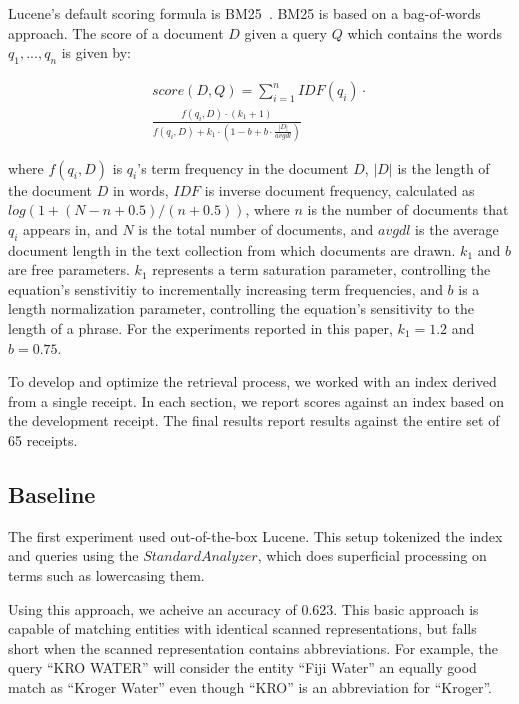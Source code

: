 \documentclass[11pt,a4paper]{article}
\begin{document}
Lucene's default scoring formula is
BM25~\cite{robertson:2009}.  BM25 is based on a
bag-of-words approach. The score of a document $D$ given a query $Q$
which contains the words $q_1, ..., q_n$ is given by: 

\begin{equation}
\begin{split}
  \label{eq:bm25}
score(D,Q) = \sum_{i=1}^{n} IDF(q_i) \cdot \\
  \frac{f(q_i, D) \cdot (k_1 + 1)}{f(q_i, D) + k_1 \cdot (1 - b + b
    \cdot \frac{|D|}{avgdl})}
\end{split}
\end{equation}

where $f(q_i, D)$ is $q_i$'s term frequency in the document $D$, $|D|$
is the length of the document $D$ in words,
$IDF$ is inverse document frequency, calculated as $log(1 + (N - n + 0.5) / (n + 0.5))$, 
where $n$ is the number of documents that $q_i$ appears in, and $N$
is the total number of documents,
and $avgdl$ is the average
document length in the text collection from which documents are
drawn. $k_1$ and $b$ are free parameters.  $k_1$ represents a term
saturation parameter, controlling the equation's senstivitiy to
incrementally increasing term frequencies, and $b$ is a length
normalization parameter, controlling the equation's sensitivity
to the length of a phrase.  For the experiments reported in this
paper, $k_1 = 1.2$ and $b = 0.75$.

To develop and optimize the retrieval process, we worked with an index
derived from a single receipt.
In each section, we report scores against an index based on the
development receipt.  The final results report results against
the entire set of 65 receipts.

\subsection{Baseline}

The first experiment used out-of-the-box Lucene.  This setup tokenized
the index and queries using the $StandardAnalyzer$, which does
superficial processing on terms such as lowercasing them.

Using this approach, we acheive an accuracy of 0.623.
This basic approach is capable of matching entities with identical
scanned representations, but falls short when the scanned
representation contains abbreviations.  For example, the
query ``KRO WATER'' will consider the entity ``Fiji Water''
an equally good match as ``Kroger Water'' even though ``KRO''
is an abbreviation for ``Kroger''.
\end{document}
